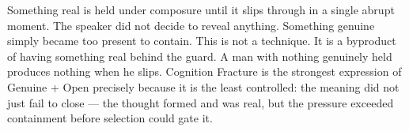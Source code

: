 Something real is held under composure until it 
slips through in a single abrupt moment. The speaker did not decide to reveal 
anything. Something genuine simply became too present to contain. This is not a 
technique. It is a byproduct of having something real behind the guard. A man 
with nothing genuinely held produces nothing when he slips. Cognition Fracture 
is the strongest expression of Genuine + Open precisely because it is the least 
controlled: the meaning did not just fail to close --- the thought formed and was 
real, but the pressure exceeded containment before selection could gate it.